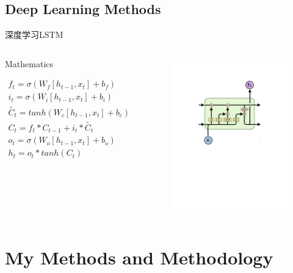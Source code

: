 \documentclass{ctexbeamer}
\begin{document}
\subsection{Deep Learning Methods}
    \begin{frame}{深度学习}{LSTM}
        \begin{columns}
            \column{0.8\textheight}
            \begin{block}{Mathematics}
            \begin{center}
            \begin{gather*}
                f_t = \sigma (W_f [h_{t-1},x_t] + b_f)\\
                i_t = \sigma (W_i [h_{t-1},x_t] + b_i)\\
                \tilde{C_t} = tanh(W_c [h_{t-1},x_t] + b_c)\\
                C_t = f_t * C_{t-1} + i_t * \tilde{C_t}\\
                o_t = \sigma (W_o [h_{t-1},x_t] + b_o)\\
                h_t = o_t * tanh(C_t)
            \end{gather*} 
            \end{center} 
            \end{block}
            \begin{figure}
                \centering
                \includegraphics[width=6cm]{LSTM.pdf}
            \end{figure}
        \end{columns}
    \end{frame}

\section{My Methods and Methodology}
\end{document}
